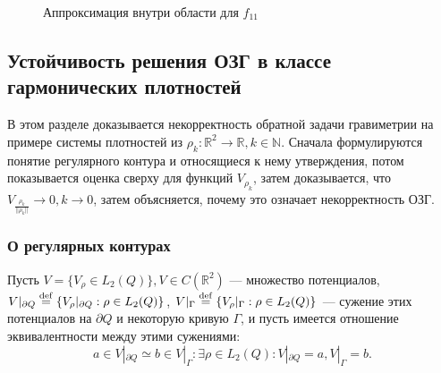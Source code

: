 \documentclass[a4paper]{article}
\newcommand{\R}[1]{\mathbb{R}^#1}
\begin{document}
\begin{figure}[h]
\begin{minipage}[h]{0.49\linewidth}
  \end{minipage}
  \caption{Аппроксимация внутри области для $f_{11}$}
  \label{d3end}
\end{figure}

\FloatBarrier
\subsection{Устойчивость решения ОЗГ в классе гармонических плотностей}
В этом разделе доказывается некорректность обратной задачи гравиметрии на примере системы плотностей из $\rho_k: \R{2}\rightarrow \mathbb{R}, k \in \mathbb{N}$.
Сначала формулируются понятие регулярного контура и относящиеся к нему утверждения, потом показывается оценка сверху для функций $V_{\rho_k}$, затем доказывается, что $V_{\frac{\rho_k}{||\rho_k||}} \rightarrow 0, k \rightarrow 0$, затем объясняется, почему это означает некорректность ОЗГ.

\subsubsection{О регулярных контурах}
Пусть
$V = \{V_{\rho} \in L_2(Q)\}, V \in C(\R{2})$ --- множество потенциалов,
\def\MYdef{\mathrel{\stackrel{\rm def}=}}
$V|_{\partial Q}\MYdef \{V_{\rho}|_{\partial Q}: \rho \in L_2(Q)\}$,
$V|_{\Gamma} \MYdef \{V_{\rho}|_{\Gamma}: \rho \in L_2(Q)\}$ --- сужение этих потенциалов на $\partial Q$ и некоторую кривую $\Gamma$,
и пусть имеется отношение эквивалентности между этими сужениями:
$$a \in V|_{\partial Q} \simeq b \in V|_{\Gamma}: \exists \rho \in L_2(Q):V|_{\partial Q}=a,V|_{\Gamma}=b.$$
\end{document}
